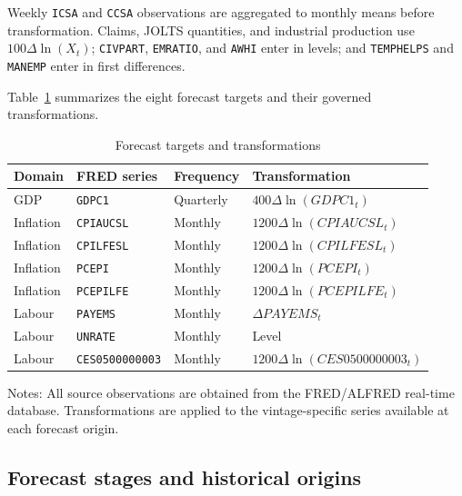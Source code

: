 Weekly \texttt{ICSA} and \texttt{CCSA} observations are aggregated to monthly
means before transformation. Claims, JOLTS quantities, and industrial
production use $100\Delta\ln(X_t)$; \texttt{CIVPART}, \texttt{EMRATIO}, and
\texttt{AWHI} enter in levels; and \texttt{TEMPHELPS} and \texttt{MANEMP}
enter in first differences.

Table~\ref{tab:targets} summarizes the eight forecast targets and their
governed transformations.

\begin{table}[H]
\centering
\caption{Forecast targets and transformations}
\label{tab:targets}
\begin{threeparttable}
\small
\begin{tabular}{llll}
\toprule
Domain & FRED series & Frequency & Transformation \\
\midrule
GDP
    & \texttt{GDPC1}
    & Quarterly
    & $400\Delta\ln(GDPC1_t)$ \\
Inflation
    & \texttt{CPIAUCSL}
    & Monthly
    & $1200\Delta\ln(CPIAUCSL_t)$ \\
Inflation
    & \texttt{CPILFESL}
    & Monthly
    & $1200\Delta\ln(CPILFESL_t)$ \\
Inflation
    & \texttt{PCEPI}
    & Monthly
    & $1200\Delta\ln(PCEPI_t)$ \\
Inflation
    & \texttt{PCEPILFE}
    & Monthly
    & $1200\Delta\ln(PCEPILFE_t)$ \\
Labour
    & \texttt{PAYEMS}
    & Monthly
    & $\Delta PAYEMS_t$ \\
Labour
    & \texttt{UNRATE}
    & Monthly
    & Level \\
Labour
    & \texttt{CES0500000003}
    & Monthly
    & $1200\Delta\ln(CES0500000003_t)$ \\
\bottomrule
\end{tabular}
\begin{tablenotes}[flushleft]\footnotesize
\item Notes: All source observations are obtained from the FRED/ALFRED
real-time database. Transformations are applied to the vintage-specific
series available at each forecast origin.
\end{tablenotes}
\end{threeparttable}
\end{table}

\subsection{Forecast stages and historical origins}
\label{subsec:forecast_stages}

